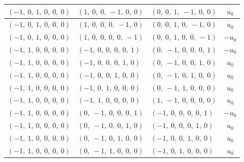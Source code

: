 \documentclass[11pt]{article}
\theoremstyle{definition}
\begin{document}
\begin{longtable}{|l|l|l|c|}
    \hline
    $\left( -1, \  0, \  1, \  0, \  0, \  0\right)$ & $\left( 1, \  0, \  0, \  -1, \  0, \  0\right)$ & $\left( 0, \  0, \  1, \  -1, \  0, \  0\right)$ & $u_{0}$ \\
    \hline
    $\left( -1, \  0, \  1, \  0, \  0, \  0\right)$ & $\left( 1, \  0, \  0, \  0, \  -1, \  0\right)$ & $\left( 0, \  0, \  1, \  0, \  -1, \  0\right)$ & $u_{0}$ \\
    \hline
    $\left( -1, \  0, \  1, \  0, \  0, \  0\right)$ & $\left( 1, \  0, \  0, \  0, \  0, \  -1\right)$ & $\left( 0, \  0, \  1, \  0, \  0, \  -1\right)$ & $- u_{0}$ \\
    \hline
    $\left( -1, \  1, \  0, \  0, \  0, \  0\right)$ & $\left( -1, \  0, \  0, \  0, \  0, \  1\right)$ & $\left( 0, \  -1, \  0, \  0, \  0, \  1\right)$ & $- u_{0}$ \\
    \hline
    $\left( -1, \  1, \  0, \  0, \  0, \  0\right)$ & $\left( -1, \  0, \  0, \  0, \  1, \  0\right)$ & $\left( 0, \  -1, \  0, \  0, \  1, \  0\right)$ & $u_{0}$ \\
    \hline
    $\left( -1, \  1, \  0, \  0, \  0, \  0\right)$ & $\left( -1, \  0, \  0, \  1, \  0, \  0\right)$ & $\left( 0, \  -1, \  0, \  1, \  0, \  0\right)$ & $u_{0}$ \\
    \hline
    $\left( -1, \  1, \  0, \  0, \  0, \  0\right)$ & $\left( -1, \  0, \  1, \  0, \  0, \  0\right)$ & $\left( 0, \  -1, \  1, \  0, \  0, \  0\right)$ & $u_{0}$ \\
    \hline
    $\left( -1, \  1, \  0, \  0, \  0, \  0\right)$ & $\left( -1, \  1, \  0, \  0, \  0, \  0\right)$ & $\left( 1, \  -1, \  0, \  0, \  0, \  0\right)$ & $u_{0}$ \\
    \hline
    $\left( -1, \  1, \  0, \  0, \  0, \  0\right)$ & $\left( 0, \  -1, \  0, \  0, \  0, \  1\right)$ & $\left( -1, \  0, \  0, \  0, \  0, \  1\right)$ & $- u_{0}$ \\
    \hline
    $\left( -1, \  1, \  0, \  0, \  0, \  0\right)$ & $\left( 0, \  -1, \  0, \  0, \  1, \  0\right)$ & $\left( -1, \  0, \  0, \  0, \  1, \  0\right)$ & $u_{0}$ \\
    \hline
    $\left( -1, \  1, \  0, \  0, \  0, \  0\right)$ & $\left( 0, \  -1, \  0, \  1, \  0, \  0\right)$ & $\left( -1, \  0, \  0, \  1, \  0, \  0\right)$ & $u_{0}$ \\
    \hline
    $\left( -1, \  1, \  0, \  0, \  0, \  0\right)$ & $\left( 0, \  -1, \  1, \  0, \  0, \  0\right)$ & $\left( -1, \  0, \  1, \  0, \  0, \  0\right)$ & $u_{0}$ \\

\end{longtable}
\end{document}
